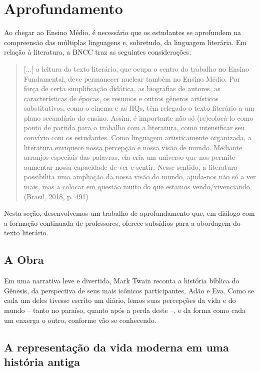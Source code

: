 \documentclass{extarticle}
\begin{document}
\section{Aprofundamento}

Ao chegar ao Ensino Médio, é necessário que os estudantes se aprofundem
na compreensão das múltiplas linguagens e, sobretudo, da linguagem
literária. Em relação à literatura, a BNCC traz as seguintes
considerações:

\begin{quote}
{[}...{]} a leitura do texto literário, que ocupa o centro do trabalho
no Ensino Fundamental, deve permanecer nuclear também no Ensino Médio.
Por força de certa simplificação didática, as biografias de autores, as
características de épocas, os resumos e outros gêneros artísticos
substitutivos, como o cinema e as HQs, têm relegado o texto literário a
um plano secundário do ensino. Assim, é importante não só (re)colocá-lo
como ponto de partida para o trabalho com a literatura, como
intensificar seu convívio com os estudantes. Como linguagem
artisticamente organizada, a literatura enriquece nossa percepção e
nossa visão de mundo. Mediante arranjos especiais das palavras, ela cria
um universo que nos permite aumentar nossa capacidade de ver e sentir.
Nesse sentido, a literatura possibilita uma ampliação da nossa visão do
mundo, ajuda-nos não só a ver mais, mas a colocar em questão muito do
que estamos vendo/vivenciando. (Brasil, 2018, p. 491)
\end{quote}

Nesta seção, desenvolvemos um trabalho de aprofundamento que, em diálogo
com a formação continuada de professores, oferece subsídios para a
abordagem do texto literário.

\subsection{A Obra}

Em uma narrativa leve e divertida, Mark Twain reconta a história bíblica
do Gênesis, da perspectiva de seus mais icônicos participantes, Adão e
Eva. Como se cada um deles tivesse escrito um diário, lemos suas
percepções da vida e do mundo -- tanto no paraíso, quanto após a perda
deste --, e da forma como cada um enxerga o outro, conforme vão se
conhecendo.

\subsection{A representação da vida moderna em uma história antiga}
\end{document}
